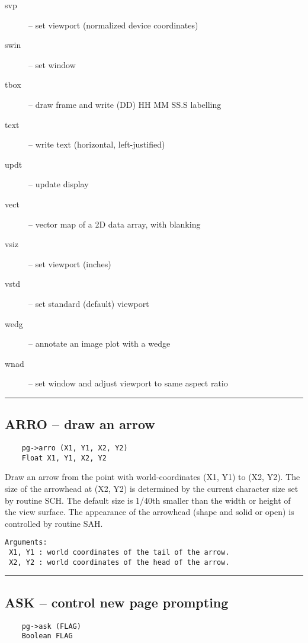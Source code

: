 \begin{description}
\item[svp] -- set viewport (normalized device coordinates)
\item[swin] -- set window
\item[tbox] -- draw frame and write (DD) HH MM SS.S labelling
\item[text] -- write text (horizontal, left-justified)
\item[updt] -- update display
\item[vect] -- vector map of a 2D data array, with blanking
\item[vsiz] -- set viewport (inches)
\item[vstd] -- set standard (default) viewport
\item[wedg] -- annotate an image plot with a wedge
\item[wnad] -- set window and adjust viewport to same aspect ratio
\end{description}

\hrule

\subsection*{ARRO -- draw an arrow }

\begin{verbatim}
    pg->arro (X1, Y1, X2, Y2)
    Float X1, Y1, X2, Y2
\end{verbatim}

Draw an arrow from the point with world-coordinates (X1, Y1) to (X2,
Y2).  The size of the arrowhead at (X2, Y2) is determined by the
current character size set by routine SCH.  The default size is 1/40th
smaller than the width or height of the view surface.  The
appearance of the arrowhead (shape and solid or open) is controlled by
routine SAH.

\begin{verbatim}
Arguments:
 X1, Y1 : world coordinates of the tail of the arrow.
 X2, Y2 : world coordinates of the head of the arrow.
\end{verbatim}

\hrule

\subsection*{ASK -- control new page prompting }

\begin{verbatim}
    pg->ask (FLAG)
    Boolean FLAG
\end{verbatim}

